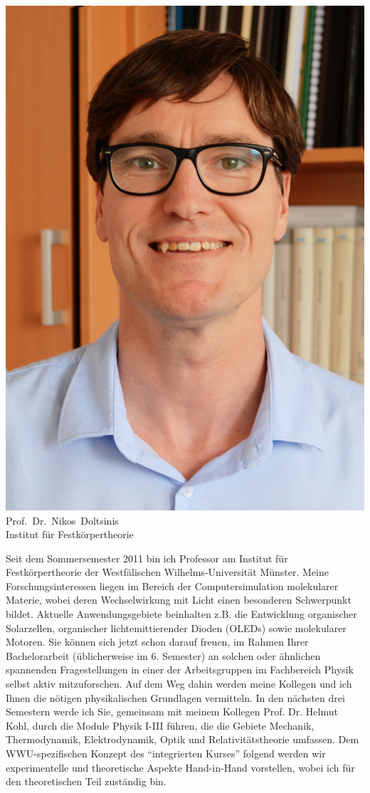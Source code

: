\begin{multicols}{2}
\begin{center}
\includegraphics[width=0.8\columnwidth]{res/vorstellungsfotos/doltsinis.jpg}\\
\smallskip
Prof.\ Dr.\ Nikos\ Doltsinis\\
Institut für Festkörpertheorie
\end{center}

Seit dem Sommersemester 2011 bin ich Professor am Institut für Festkörpertheorie der Westfälischen Wilhelms-Universität Münster. Meine Forschungsinteressen liegen im Bereich der Computersimulation molekularer Materie, wobei deren Wechselwirkung mit Licht einen besonderen Schwerpunkt bildet.  Aktuelle Anwendungsgebiete beinhalten z.B. die Entwicklung organischer Solarzellen, organischer lichtemittierender Dioden (OLEDs) sowie molekularer Motoren. Sie können sich jetzt schon darauf freuen, im Rahmen Ihrer Bachelorarbeit (üblicherweise im 6. Semester) an solchen oder ähnlichen spannenden Fragestellungen in einer der Arbeitsgruppen im Fachbereich Physik selbst aktiv mitzuforschen. Auf dem Weg dahin werden meine Kollegen und ich Ihnen die nötigen physikalischen Grundlagen vermitteln. In den nächsten drei Semestern werde ich Sie, gemeinsam mit meinem Kollegen Prof. Dr. Helmut Kohl, durch die Module Physik I-III führen, die die Gebiete Mechanik, Thermodynamik, Elektrodynamik, Optik und Relativitätstheorie umfassen. Dem WWU-spezifischen Konzept des “integrierten Kurses” folgend werden wir experimentelle und theoretische Aspekte Hand-in-Hand vorstellen, wobei ich für den theoretischen Teil zuständig bin. 


\end{multicols}
